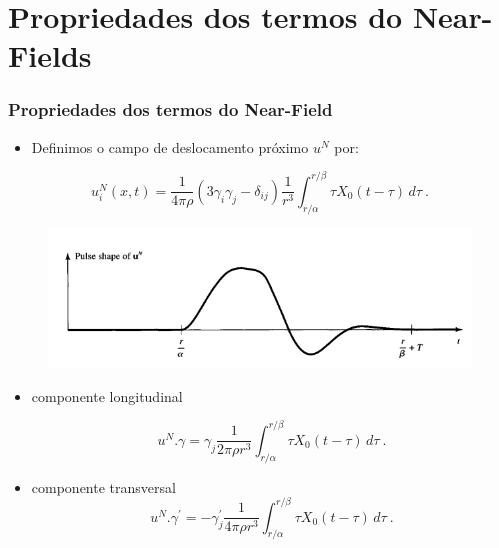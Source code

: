 \documentclass[10pt,a4paper]{beamer}
\begin{document}
\section{Propriedades dos termos do Near-Fields}

\begin{frame}

\frametitle {Propriedades dos termos do Near-Field}

\begin{itemize}
\item Definimos o campo de deslocamento próximo $u^{N}$ por:
\end{itemize}

\begin{equation}
u_{i}^{N}(x,t)= \frac{1}{4\pi\rho}(3\gamma_{i}\gamma_{j}-\delta_{ij})\frac{1}{r^{3}} \int_{r/\alpha}^{r/\beta} \tau X_{0}(t-\tau) \,d\tau\ .
\end{equation}

\begin{figure}
\includegraphics[scale=1.5]{fig1.png}
\end{figure}


\end{frame}

\begin{frame}
\begin{itemize}
\item componente longitudinal

\begin{equation}
u^{N}.\gamma= \gamma _{j}\frac{1}{2\pi\rho r^{3}}\int_{r/\alpha}^{r/\beta} \tau X_{0}(t-\tau) \,d\tau\ .
\end{equation}

\item componente transversal
\begin{equation}
u^{N}.\gamma^{'}= -\gamma^{'} _{j}\frac{1}{4\pi\rho r^{3}}\int_{r/\alpha}^{r/\beta} \tau X_{0}(t-\tau) \,d\tau\ .
\end{equation}
\end{itemize}


\end{frame}
\end{document}
